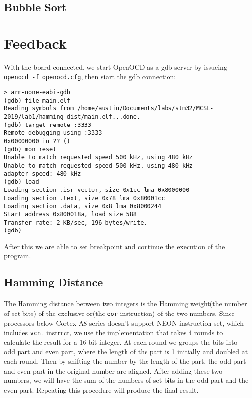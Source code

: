 \subsection{Bubble Sort}
\paragraph{}
\section{Feedback}
\paragraph{}
With the board connected, we start OpenOCD as a gdb server by issueing \texttt{openocd -f openocd.cfg}, then start the gdb connection:
\begin{lstlisting}
> arm-none-eabi-gdb
(gdb) file main.elf
Reading symbols from /home/austin/Documents/labs/stm32/MCSL-2019/lab1/hamming_dist/main.elf...done.
(gdb) target remote :3333
Remote debugging using :3333
0x00000000 in ?? ()
(gdb) mon reset
Unable to match requested speed 500 kHz, using 480 kHz
Unable to match requested speed 500 kHz, using 480 kHz
adapter speed: 480 kHz
(gdb) load
Loading section .isr_vector, size 0x1cc lma 0x8000000
Loading section .text, size 0x78 lma 0x80001cc
Loading section .data, size 0x8 lma 0x8000244
Start address 0x800018a, load size 588
Transfer rate: 2 KB/sec, 196 bytes/write.
(gdb)
\end{lstlisting}
After this we are able to set breakpoint and continue the execution of the program.
\subsection{Hamming Distance}
\paragraph{}
The Hamming distance between two integers is the Hamming weight(the number of set bits)
of the exclusive-or(the \texttt{eor} instruction) of the two numbers.
Since processors below Cortex-A8 series doesn't support NEON instruction set, which includes \texttt{vcnt} instruct, we use the implementation
that takes 4 rounds to calculate the result for a 16-bit integer. At each round we groups the bits into odd part and even part,
where the length of the part is 1 initially and doubled at each round.
Then by shifting the number by the length of the part, the odd part and even part in the original number are aligned. 
After adding these two numbers, we will have the sum of the numbers of set bits in the odd part and the even part.
Repeating this procedure will produce the final result.
